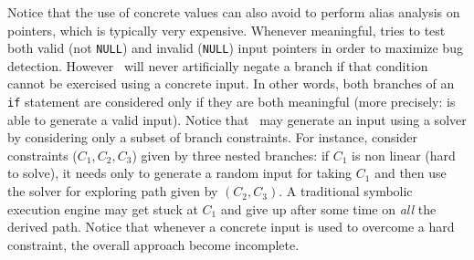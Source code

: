 Notice that the use of concrete values can also avoid to perform alias analysis on pointers, which is typically very expensive. Whenever meaningful, \cite{DART-PLDI05} tries to test both valid (not {\tt NULL}) and invalid ({\tt NULL}) input pointers in order to maximize bug detection. However~\cite{DART-PLDI05} will never artificially negate a branch if that condition cannot be exercised using a concrete input. In other words, both branches of an {\tt if} statement are considered only if they are both meaningful (more precisely: \cite{DART-PLDI05} is able to generate a valid input). Notice that~\cite{DART-PLDI05} may generate an input using a solver by considering only a subset of branch constraints. For instance, consider constraints ($C_1, C_2, C_3$) given by three nested branches: if $C_1$ is non linear (hard to solve), it needs only to generate a random input for taking $C_1$ and then use the solver for exploring path given by $(C_2, C_3)$. A traditional symbolic execution engine may get stuck at $C_1$ and give up after some time on {\em all} the derived path. Notice that whenever a concrete input is used to overcome a hard constraint, the overall approach become incomplete.

\iffalse
